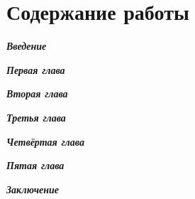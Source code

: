 \section*{Содержание работы}

\textbf{\textit{Введение}}

\textbf{\textit{Первая глава}}

\textbf{\textit{Вторая глава}}

\textbf{\textit{Третья глава}}

\textbf{\textit{Четвёртая глава}}

\textbf{\textit{Пятая глава}}

\textbf{\textit{Заключение}}
